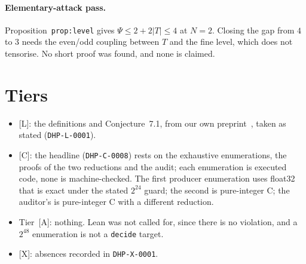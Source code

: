\documentclass[10pt]{article}
\newcommand{\tier}[1]{\textsf{[#1]}}
\newcommand{\tA}{\tier{A}}
\newcommand{\tC}{\tier{C}}
\newcommand{\tL}{\tier{L}}
\newcommand{\tX}{\tier{X}}
\begin{document}
\paragraph{Elementary-attack pass.} Proposition~\texttt{prop:level} gives $\Psi\le2+2|T|\le4$ at $N=2$. Closing the gap from $4$ to $3$ needs the even/odd coupling between $T$ and the fine level, which does not tensorise. No short proof was found, and none is claimed.

\section{Tiers}\label{sec:tiers}
\begin{itemize}\itemsep=1pt
\item \tL{}: the definitions and Conjecture~7.1, from our own preprint~\cite{dh}, taken as stated (\texttt{DHP-L-0001}).
\item \tC{}: the headline (\texttt{DHP-C-0008}) rests on the exhaustive enumerations, the proofs of the two reductions and the audit; each enumeration is executed code, none is machine-checked. The first producer enumeration uses float32 that is exact under the stated $2^{24}$ guard; the second is pure-integer C; the auditor's is pure-integer C with a different reduction.
\item Tier~\tA{}: nothing. Lean was not called for, since there is no violation, and a $2^{48}$ enumeration is not a \texttt{decide} target.
\item \tX{}: absences recorded in \texttt{DHP-X-0001}.
\end{itemize}
\end{document}
